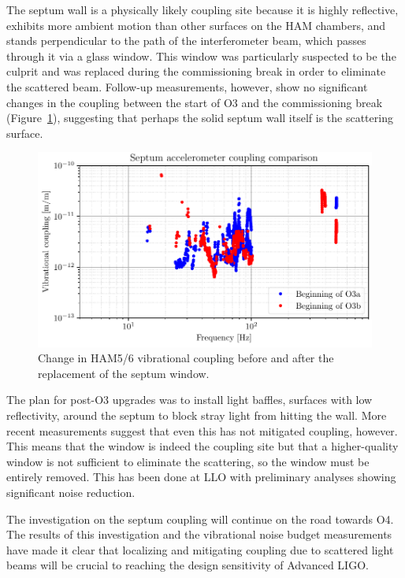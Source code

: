 The septum wall is a physically likely coupling site because it is highly reflective, exhibits more ambient motion than other surfaces on the HAM chambers, and stands perpendicular to the path of the interferometer beam, which passes through it via a glass window.
This window was particularly suspected to be the culprit and was replaced during the commissioning break in order to eliminate the scattered beam.
Follow-up measurements, however, show no significant changes in the coupling between the start of O3 and the commissioning break (Figure~\ref{fig:vib-septum-comparison}), suggesting that perhaps the solid septum wall itself is the scattering surface.

\begin{figure}[htb]
	\includegraphics{figures/noise-studies/vib-septum-comparison.pdf}
	\caption{Change in HAM5/6 vibrational coupling before and after the replacement of the septum window.}
	\label{fig:vib-septum-comparison}
\end{figure}

The plan for post-O3 upgrades was to install light baffles, surfaces with low reflectivity, around the septum to block stray light from hitting the wall.
More recent measurements suggest that even this has not mitigated coupling, however.
This means that the window is indeed the coupling site but that a higher-quality window is not sufficient to eliminate the scattering, so the window must be entirely removed.
This has been done at LLO with preliminary analyses showing significant noise reduction.

The investigation on the septum coupling will continue on the road towards O4.
The results of this investigation and the vibrational noise budget measurements have made it clear that localizing and mitigating coupling due to scattered light beams will be crucial to reaching the design sensitivity of Advanced LIGO.



